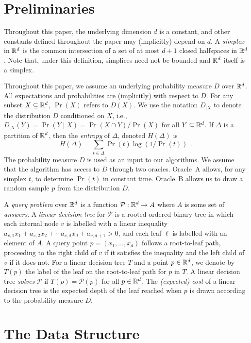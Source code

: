 \documentclass{patmorin}
\begin{document}
\section{Preliminaries}

Throughout this paper, the underlying dimension $d$ is a constant, and
other constants defined throughout the paper may (implicitly) depend
on $d$.  A \emph{simplex} in $\mathbb{R}^d$ is the common intersection of a
set of at most $d+1$ closed halfspaces in $\mathbb{R}^d$. Note that, under this
definition, simplices need not be bounded and $\mathbb{R}^d$ itself is a simplex.

Throughout this paper, we assume an underlying probability measure
$D$ over $\mathbb{R}^d$.  All expectations and probabilities are (implicitly)
with respect to $D$.  For any subset $X\subseteq\mathbb{R}^d$, $\Pr(X)$ refers
to $D(X)$.  We use the notation $D_{|X}$ to denote the distribution $D$
conditioned on $X$, i.e., $D_{|X}(Y)=\Pr(Y\mid X)=\Pr(X\cap Y)/\Pr(X)$
for all $Y\subseteq\mathbb{R}^d$.  If $\Delta$ is a partition of $\mathbb{R}^d$, then
the \emph{entropy} of $\Delta$, denoted $H(\Delta)$ is
\[
    H(\Delta) = \sum_{t\in \Delta} \Pr(t)\log(1/\Pr(t)) \enspace .
\]
The probability measure $D$ is used as an input to our algorithms.
We assume that the algorithm has access to $D$ through two oracles.
Oracle~A allows, for any simplex $t$, to determine $\Pr(t)$ in
constant time.  Oracle~B allows us to draw a random sample $p$ from the
distribution $D$.

A \emph{query problem} over $\mathbb{R}^d$ is a function
$\mathcal{P}:\mathbb{R}^d\rightarrow A$ where $A$ is some set of \emph{answers}.
A \emph{linear decision tree} for $\mathcal{P}$ is a rooted ordered
binary tree in which each internal node $v$ is labelled with a linear
inequality $a_{v,1}x_1 + a_{v,2}x_2 + \cdots a_{v,d}x_d + a_{v,d+1} >
0$, and each leaf $\ell$ is labelled with an element of $A$.  A query
point $p=(x_1,\ldots,x_d)$ follows a root-to-leaf path, proceeding
to the right child of $v$ if it satisfies the inequality and the left
child of $v$ if it does not.  For a linear decision tree $T$ and a point
$p\in\mathbb{R}^d$, we denote by $T(p)$ the label of the leaf on the root-to-leaf
path for $p$ in $T$.  A linear decision tree \emph{solves} $\mathcal{P}$
if $T(p)=\mathcal{P}(p)$ for all $p\in\mathbb{R}^d$.  The \emph{(expected) cost}
of a linear decision tree is the expected depth of the leaf reached when
$p$ is drawn according to the probability measure $D$.

\section{The Data Structure}
\end{document}
